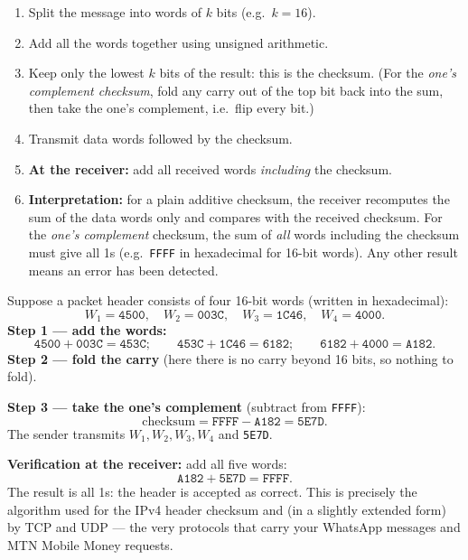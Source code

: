 \documentclass[11pt]{article}
\newcommand{\cle}[1]{{\popxbold\color{popdark}#1}}
\begin{document}
\begin{methode}
\begin{enumerate}
\item Split the message into words of $k$ bits (e.g.\ $k = 16$).
\item Add all the words together using unsigned arithmetic.
\item Keep only the lowest $k$ bits of the result: this is the \cle{checksum}. (For the \emph{one's complement checksum}, fold any carry out of the top bit back into the sum, then take the one's complement, i.e.\ flip every bit.)
\item Transmit data words followed by the checksum.
\item \textbf{At the receiver:} add all received words \emph{including} the checksum.
\item \textbf{Interpretation:} for a plain additive checksum, the receiver recomputes the sum of the data words only and compares with the received checksum. For the \emph{one's complement} checksum, the sum of \emph{all} words including the checksum must give all 1s (e.g.\ \texttt{FFFF} in hexadecimal for 16-bit words). Any other result means an error has been detected.
\end{enumerate}
\end{methode}

\begin{exemplebox}
Suppose a packet header consists of four 16-bit words (written in hexadecimal):
\[
W_1 = \texttt{4500},\quad W_2 = \texttt{003C},\quad W_3 = \texttt{1C46},\quad W_4 = \texttt{4000}.
\]
\textbf{Step 1 --- add the words:}
\[
\texttt{4500} + \texttt{003C} = \texttt{453C};\qquad
\texttt{453C} + \texttt{1C46} = \texttt{6182};\qquad
\texttt{6182} + \texttt{4000} = \texttt{A182}.
\]
\textbf{Step 2 --- fold the carry} (here there is no carry beyond 16 bits, so nothing to fold).

\textbf{Step 3 --- take the one's complement} (subtract from \texttt{FFFF}):
\[
\text{checksum} = \texttt{FFFF} - \texttt{A182} = \texttt{5E7D}.
\]
The sender transmits $W_1, W_2, W_3, W_4$ and \texttt{5E7D}.

\textbf{Verification at the receiver:} add all five words:
\[
\texttt{A182} + \texttt{5E7D} = \texttt{FFFF}.
\]
The result is all 1s: the header is accepted as correct. This is precisely the algorithm used for the \cle{IPv4 header checksum} and (in a slightly extended form) by TCP and UDP --- the very protocols that carry your WhatsApp messages and MTN Mobile Money requests.
\end{exemplebox}
\end{document}
